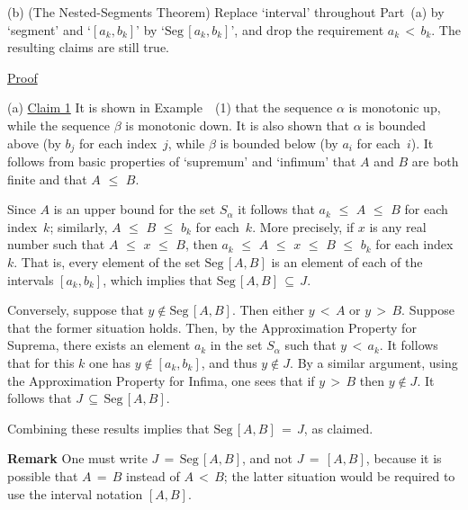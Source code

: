 \V

        (b) (The Nested-Segments Theorem) Replace `interval' throughout Part~(a) by `segment' and `$[a_{k},b_{k}]$' by `$\mbox{Seg}\,[a_{k},b_{k}]$',
    and drop the requirement $a_{k}\,<\,b_{k}$. The resulting claims are still true.

\V

        \underline{Proof}

\V

        (a) \underline{Claim 1} It is shown in Example~~(1) that the sequence ${\alpha}$ is monotonic up,
    while the sequence ${\beta}$ is monotonic down. It is also shown that ${\alpha}$ is bounded above (by $b_{j}$ for each index~$j$,
    while ${\beta}$ is bounded below (by $a_{i}$ for each~$i$). It follows from basic properties of `supremum' and `infimum'
    that $A$ and $B$ are both finite and that $A\,\,{\leq}\,\,B$.

        Since $A$ is an upper bound for the set $S_{{\alpha}}$ it follows that  $a_{k}\,\,{\leq}\,\,A\,\,{\leq}\,\,B$ for each index~$k$;
    similarly, $A\,\,{\leq}\,\,B\,\,{\leq}\,\,b_{k}$ for each~$k$. More precisely, if $x$ is any real number such that 
    $A\,\,{\leq}\,\,x\,\,{\leq}\,\,B$, then $a_{k}\,\,{\leq}\,\,A\,\,{\leq}\,\,x\,\,{\leq}\,\,B\,\,{\leq}\,\,b_{k}$
    for each index~$k$. That is, every element of the set $\mbox{Seg}\,[A,B]$ is an element of each of the intervals $[a_{k},b_{k}]$,
    which implies that $\mbox{Seg}\,[A,B] \,{\subseteq}\, J$.

    Conversely, suppose that $y \not \in \mbox{Seg}\,[A,B]$. Then either $y\,<\,A$ or $y\,>\,B$. Suppose that the former situation holds.
    Then, by the Approximation Property for Suprema, there exists an element $a_{k}$ in the set $S_{{\alpha}}$ such that $y\,<\,a_{k}$.
    It follows that for this $k$ one has $y \not \in [a_{k},b_{k}]$, and thus $y \not \in J$.
    By a similar argument, using the Approximation Property for Infima, one sees that if $y\,>\,B$ then $y \not \in J$.
    It follows that $J \,{\subseteq}\, \mbox{Seg}\,[A,B]$.

        Combining these results implies that $\mbox{Seg}\,[A,B] \,=\, J$, as claimed.

        {\bf Remark} One must write $J \,=\, \mbox{Seg}\,[A,B]$, and not $J \,=\, [A,B]$, because it is possible that $A \,=\, B$ instead of $A\,<\,B$;
    the latter situation would be required to use the interval notation $[A,B]$.

\VA


